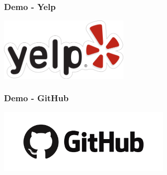 \documentclass{beamer}
\begin{document}
\begin{frame}
  \frametitle{Demo - Yelp}
  \begin{center}
    \includegraphics[width=240]{img/yelp-logo.png}
  \end{center}
\end{frame}


\begin{frame}
  \frametitle{Demo - GitHub}
  \begin{center}
    \includegraphics[width=320]{img/github-logo.png}
  \end{center}
\end{frame}
\end{document}
